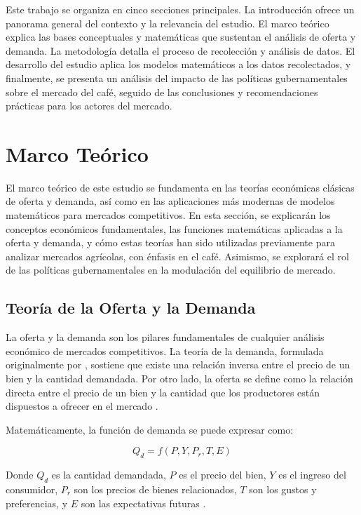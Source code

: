 \documentclass[12pt, a4paper]{article}
\begin{document}
Este trabajo se organiza en cinco secciones principales. La introducción ofrece un panorama general del contexto y la relevancia del estudio. El marco teórico explica las bases conceptuales y matemáticas que sustentan el análisis de oferta y demanda. La metodología detalla el proceso de recolección y análisis de datos. El desarrollo del estudio aplica los modelos matemáticos a los datos recolectados, y finalmente, se presenta un análisis del impacto de las políticas gubernamentales sobre el mercado del café, seguido de las conclusiones y recomendaciones prácticas para los actores del mercado.

\section{Marco Teórico}

El marco teórico de este estudio se fundamenta en las teorías económicas clásicas de oferta y demanda, así como en las aplicaciones más modernas de modelos matemáticos para mercados competitivos. En esta sección, se explicarán los conceptos económicos fundamentales, las funciones matemáticas aplicadas a la oferta y demanda, y cómo estas teorías han sido utilizadas previamente para analizar mercados agrícolas, con énfasis en el café. Asimismo, se explorará el rol de las políticas gubernamentales en la modulación del equilibrio de mercado.

\subsection{Teoría de la Oferta y la Demanda}

La oferta y la demanda son los pilares fundamentales de cualquier análisis económico de mercados competitivos. La teoría de la demanda, formulada originalmente por \cite{marshall1890}, sostiene que existe una relación inversa entre el precio de un bien y la cantidad demandada. Por otro lado, la oferta se define como la relación directa entre el precio de un bien y la cantidad que los productores están dispuestos a ofrecer en el mercado \parencite{varian2014}. 

Matemáticamente, la función de demanda se puede expresar como:

\[Q_d = f(P, Y, P_r, T, E)\]

Donde $Q_d$ es la cantidad demandada, $P$ es el precio del bien, $Y$ es el ingreso del consumidor, $P_r$ son los precios de bienes relacionados, $T$ son los gustos y preferencias, y $E$ son las expectativas futuras \parencite{nicholson2017}.
\end{document}

